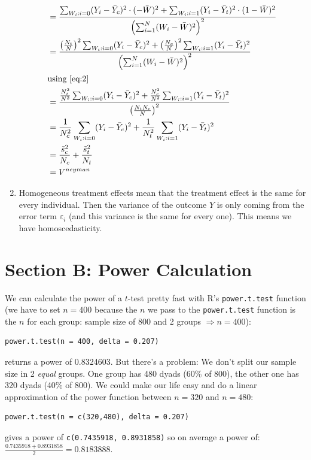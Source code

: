 \documentclass{article}
\begin{document}
\begin{enumerate}[label=(\alph*)]
\begin{align}
			&= \frac{\sum_{W_i:i=0} (Y_i-\bar{Y}_c)^2\cdot (-\bar{W})^2 + \sum_{W_i:i=1} (Y_i-\bar{Y}_t)^2\cdot(1-\bar{W})^2}{\left(\sum_{i=1}^N (W_i-\bar{W})^2\right)^2} \notag \\
			&= \frac{\left(\frac{N_t}{N}\right)^2\sum_{W_i:i=0} (Y_i-\bar{Y}_c)^2 + \left(\frac{N_c}{N}\right)^2\sum_{W_i:i=1} (Y_i-\bar{Y}_t)^2}{\left(\sum_{i=1}^N (W_i-\bar{W})^2\right)^2} \notag \\
			\intertext{using \eqref{eq:2}}
			&= \frac{\frac{N_t^2}{N^2}\sum_{W_i:i=0} (Y_i-\bar{Y}_c)^2 + \frac{N_c^2}{N^2}\sum_{W_i:i=1} (Y_i-\bar{Y}_t)^2}{\left(\frac{N_tN_c}{N}\right)^2} \notag \\
			&= \frac{1}{N_c^2}\sum_{W_i:i=0} (Y_i-\bar{Y}_c)^2 + \frac{1}{N_t^2}\sum_{W_i:i=1}(Y_i-\bar{Y}_t)^2 \notag \\
			&= \frac{\tilde{s}_c^2}{N_c} + \frac{\tilde{s}_t^2}{N_t} \notag \\
			&= V^{neyman} \notag
		\end{align}
		\item Homogeneous treatment effects mean that the treatment effect is the same for every individual. Then the variance of the outcome $Y$ is only coming from the error term $\varepsilon_i$ (and this variance is the same for every one). This means we have homoscedasticity.
	\end{enumerate}

	\section*{Section B: Power Calculation}
	We can calculate the power of a $t$-test pretty fast with R's \texttt{power.t.test} function (we have to set $n=400$ because the $n$ we pass to the \texttt{power.t.test} function is the $n$ for each group: sample size of 800 and 2 groups $\Rightarrow n = 400$):
	\begin{lstlisting}
power.t.test(n = 400, delta = 0.207)
	\end{lstlisting}
	returns a power of 0.8324603. But there's a problem: We don't split our sample size in 2 \textit{equal} groups. One group has 480 dyads (60\% of 800), the other one has 320 dyads (40\% of 800). We could make our life easy and do a linear approximation of the power function between $n=320$ and $n=480$:
	\begin{lstlisting}
power.t.test(n = c(320,480), delta = 0.207)
	\end{lstlisting}
	gives a power of \texttt{c(0.7435918, 0.8931858)} so on average a power of: $\frac{0.7435918 + 0.8931858}{2} = 0.8183888$. 
	
\end{document}
